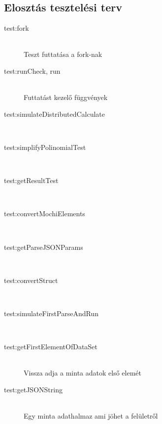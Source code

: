 \subsection{Elosztás tesztelési terv}
	\begin{description}
		\item[test:fork] \hfill \\
			Teszt futtatása a fork-nak

		\item[test:runCheck, run] \hfill \\
			Futtatást kezelő függvények 

		\item[test:simulateDistributedCalculate] \hfill \\

		\item[test:simplifyPolinomialTest] \hfill \\

		\item[test:getResultTest] \hfill \\

		\item[test:convertMochiElements] \hfill \\

		\item[test:getParseJSONParams] \hfill \\

		\item[test:convertStruct] \hfill \\
		\item[test:simulateFirstParseAndRun] \hfill \\
		\item[test:getFirstElementOfDataSet] \hfill \\
		Vissza adja a minta adatok első elemét
		\item[test:getJSONString] \hfill \\
		Egy minta adathalmaz ami jöhet a felületről
	\end{description}	